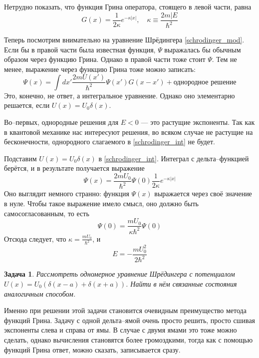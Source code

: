 \documentclass{article}
\newtheorem{problem}{Задача}
\begin{document}
Нетрудно показать, что функция Грина оператора, стоящего в левой части, равна
\begin{equation}
    G(x) = \frac{1}{2\kappa} e^{-\kappa |x|}, \quad \kappa \equiv \frac{2m|E}{\hbar^2}
\end{equation}

Теперь посмотрим внимательно на уравнение Шрёдингера \eqref{schrodinger_mod}. Если бы
в правой части была известная функция, $\Psi$ выражалась бы обычным образом через 
функцию Грина. Однако в правой части тоже стоит $\Psi$. Тем не менее, выражение через 
функцию Грина тоже можно записать:
\begin{equation}
    \label{schrodinger_int}
    \Psi(x) = \int dx' \frac{2mU(x')}{\hbar^2} \Psi(x') G(x - x') + \text{однородное решение}
\end{equation}
Это, конечно, не ответ, а интегральное уравнение. Однако оно элементарно решается, если
$U(x) = U_0 \delta(x)$. 

Во--первых, однородные решения для $E < 0$ --- это растущие экспоненты. Так как в квантовой
механике нас интересуют решения, во всяком случае не растущие на бесконечности, однородного
слагаемого в \eqref{schrodinger_int} не будет. 

Подставим $U(x) = U_0 \delta(x)$ в \eqref{schrodinger_int}. Интеграл с дельта--функцией 
берётся, и в результате получается выражение
\begin{equation}
   \Psi(x) = \frac{2mU_0}{\hbar^2} \Psi(0) \frac{1}{2\kappa} e^{-\kappa |x|}
\end{equation}
Оно выглядит немного странно: функция $\Psi(x)$ выражается через своё значение в нуле. 
Чтобы такое выражение имело смысл, оно должно быть самосогласованным, то есть
\begin{equation}
   \Psi(0) = \frac{mU_0}{\kappa\hbar^2} \Psi(0) 
\end{equation}
Отсюда следует, что $\kappa = \frac{mU_0}{\hbar^2}$, и 
\begin{equation}
    E = -\frac{mU_0^2}{2\hbar^2}
\end{equation}

\begin{problem}
Рассмотреть одномерное уравнение Шрёдингера с потенциалом 
$U(x) = U_0(\delta(x - a) + \delta(x + a))$. Найти в нём связанные состояния аналогичным 
способом. 
\end{problem}

Именно при решении этой задачи становится очевидным преимущество метода функций Грина. Задачу
с одной дельта--ямой очень просто решить, просто сшивая экспоненты слева и справа от 
ямы. В случае с двумя ямами это тоже можно сделать, однако вычисления становятся более
громоздкими, тогда как с помощью функций Грина ответ, можно сказать, записывается сразу.
\end{document}
